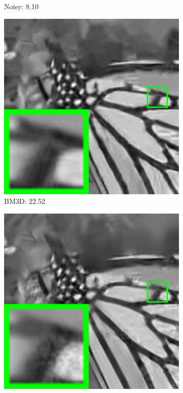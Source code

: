 \begin{figure}
\begin{adjustwidth}{-2cm}{}
\begin{subfigure}[t]{0.19\textwidth}
		\caption{Noisy: 8.10}
    \end{subfigure}
    \hfill
    \begin{subfigure}[t]{0.19\textwidth}
        \centering
        \includegraphics[width=1\textwidth]{images/twsc/awgn/br_BM3D_100_monarch.png}
		\caption{BM3D: 22.52}
    \end{subfigure}
    \hfill
    \begin{subfigure}[t]{0.19\textwidth}
        \centering
        \includegraphics[width=1\textwidth]{images/twsc/awgn/br_LSSC_100_monarch.png}

\end{subfigure}
\end{adjustwidth}
\end{figure}
